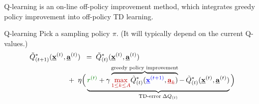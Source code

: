 \begin{frame}\frametitle{\subsecname}

Q-learning is an on-line off-policy improvement method, which integrates greedy policy improvement into off-policy TD learning.

\begin{block}{Q-learning}
	Pick a sampling policy $\pi$. (It will typically depend on the current Q-values.)
	\slidesonly{\vspace{-3mm}}
	\begin{align}
			\tilde Q_{(t+1)}^*(\vec x^{(t)}, \vec a^{(t)})
			\;\;=\;\;&
			\tilde Q_{(t)}^*(\vec x^{(t)}, \vec a^{(t)})
			\\
			&\kern-10ex
			 \;+\; \lr \Big( \underbrace{
				{\color{reward}r^{(t)}} + \gamma 
				\overbrace{
					{\color{policy} \max_{1 \leq k\leq A}}
					\tilde Q_{(t)}^*({\color{trans}\vec x^{(t+1)}}, 
						{\color{policy}\vec a_k})
				}^{\text{\scriptsize \kern-2exgreedy policy improvement\kern-2ex}}
				- \, \tilde Q_{(t)}^*(\vec x^{(t)}, \vec a^{(t)})	
				}_{\text{\scriptsize TD-error} \displaystyle \scriptstyle \;\Delta Q_{(t)} }\Big)
	\end{align}
\end{block}
	

\end{frame}

